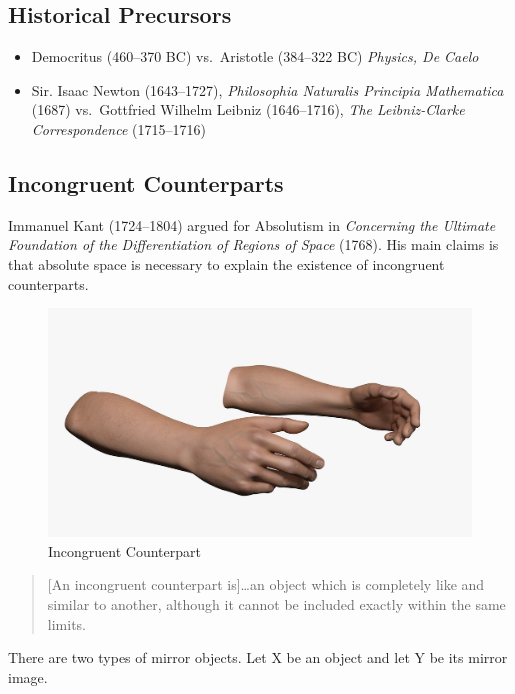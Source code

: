 \documentclass[oneside]{article}
\begin{document}
\subsection*{Historical Precursors}\label{historical-precursors}

\begin{itemize}
\item
  Democritus (460--370 BC) vs.~Aristotle (384--322 BC) \emph{Physics, De
  Caelo}
\item
  Sir. Isaac Newton (1643--1727), \emph{Philosophia Naturalis Principia
  Mathematica} (1687) vs.~Gottfried Wilhelm Leibniz (1646--1716),
  \emph{The Leibniz-Clarke Correspondence} (1715--1716)
\end{itemize}

\subsection*{Incongruent Counterparts}\label{incongruent-counterparts}




Immanuel Kant (1724--1804) argued for Absolutism in \emph{Concerning the
Ultimate Foundation of the Differentiation of Regions of Space} (1768).
His main claims is that absolute space is necessary to explain the existence of
incongruent counterparts.

\begin{figure}[h]
  \includegraphics[width=\linewidth]{hands.jpg}
  \caption{Incongruent Counterpart}
\end{figure}

\begin{quote}
{[}An incongruent counterpart is{]}\ldots{}an object which is completely
like and similar to another, although it cannot be included exactly
within the same limits.
\end{quote}
There are two types of mirror objects. Let X be an object and let Y be
its mirror image.
\end{document}
